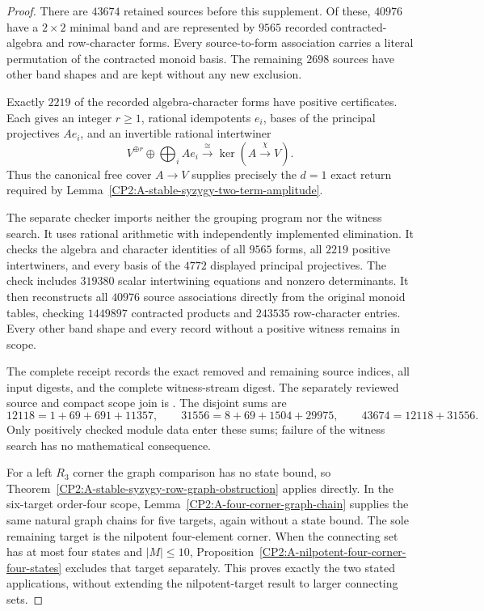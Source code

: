 \begin{proof}
There are $43674$ retained sources before this supplement.  Of
these, $40976$ have a $2\times2$ minimal band and are represented
by $9565$ recorded contracted-algebra and row-character forms.
Every source-to-form association carries a literal permutation of
the contracted monoid basis.  The remaining $2698$ sources have
other band shapes and are kept without any new exclusion.

Exactly $2219$ of the recorded algebra-character forms have
positive certificates.  Each gives an integer $r\ge1$, rational
idempotents $e_i$, bases of the principal projectives $Ae_i$,
and an invertible rational intertwiner
\[
 V^{\oplus r}\oplus\bigoplus_i Ae_i
       \xrightarrow{\cong}\ker(A\xrightarrow{\chi}V).
\]
Thus the canonical free cover $A\to V$ supplies precisely the
$d=1$ exact return required by
Lemma~\ref{CP2:A-stable-syzygy-two-term-amplitude}.

The separate checker
imports neither the grouping program nor the witness search.
It uses rational arithmetic with independently implemented
elimination.  It checks the algebra and character identities of
all $9565$ forms, all $2219$ positive intertwiners, and every basis
of the $4772$ displayed principal projectives.  The check includes
$319380$ scalar intertwining equations and nonzero determinants.
It then reconstructs all $40976$ source associations directly from
the original monoid tables, checking $1449897$ contracted products
and $243535$ row-character entries.  Every other band shape and
every record without a positive witness remains in scope.

The complete receipt
records the exact removed and remaining source indices, all input
digests, and the complete witness-stream digest.  The separately
reviewed source and compact scope join is
.
The disjoint sums are
\[
 12118=1+69+691+11357,\qquad
 31556=8+69+1504+29975,\qquad
 43674=12118+31556.
\]
Only positively checked module data enter these sums; failure of
the witness search has no mathematical consequence.

For a left $R_3$ corner the graph comparison has no state bound,
so Theorem~\ref{CP2:A-stable-syzygy-row-graph-obstruction} applies
directly.  In the six-target order-four scope,
Lemma~\ref{CP2:A-four-corner-graph-chain} supplies the same natural
graph chains for five targets, again without a state bound.
The sole remaining target is the nilpotent four-element corner.
When the connecting set has at most four states and $|M|\le10$,
Proposition~\ref{CP2:A-nilpotent-four-corner-four-states} excludes
that target separately.  This proves exactly the two stated
applications, without extending the nilpotent-target result to
larger connecting sets.
\end{proof}

